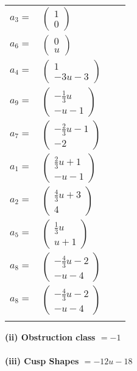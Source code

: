 \documentclass[1p]{elsarticle_modified}
\theoremstyle{definition}
\begin{document}
\begin{tabular}{m{7pt} m{180pt} m{7pt} m{180pt} }
\flushright $a_{3}=$&$\begin{pmatrix}1\\0\end{pmatrix}$ \\
\flushright $a_{6}=$&$\begin{pmatrix}0\\u\end{pmatrix}$ \\
\flushright $a_{4}=$&$\begin{pmatrix}1\\-3 u-3\end{pmatrix}$ \\
\flushright $a_{9}=$&$\begin{pmatrix}-\frac{1}{3} u\\- u-1\end{pmatrix}$ \\
\flushright $a_{7}=$&$\begin{pmatrix}-\frac{2}{3} u-1\\-2\end{pmatrix}$ \\
\flushright $a_{1}=$&$\begin{pmatrix}\frac{2}{3} u+1\\- u-1\end{pmatrix}$ \\
\flushright $a_{2}=$&$\begin{pmatrix}\frac{4}{3} u+3\\4\end{pmatrix}$ \\
\flushright $a_{5}=$&$\begin{pmatrix}\frac{1}{3} u\\u+1\end{pmatrix}$ \\
\flushright $a_{8}=$&$\begin{pmatrix}-\frac{4}{3} u-2\\- u-4\end{pmatrix}$\\ \flushright $a_{8}=$&$\begin{pmatrix}-\frac{4}{3} u-2\\- u-4\end{pmatrix}$\\&\end{tabular}
\flushleft \textbf{(ii) Obstruction class $= -1$}\\~\\
\flushleft \textbf{(iii) Cusp Shapes $= -12 u-18$}\\~\\
\end{document}
